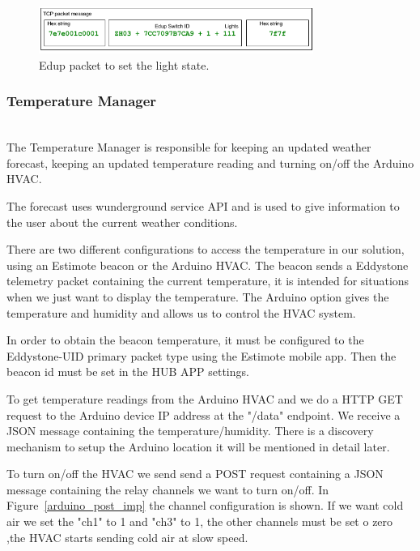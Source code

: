 \begin{figure}[h]
\centering
\includegraphics[width=0.8\textwidth]{Figures/Edup_imp}
\caption{Edup packet to set the light state.}
\label{edup_imp}
\end{figure}


\subsubsection{Temperature Manager}\mbox{}\\


The Temperature Manager is responsible for keeping an updated weather forecast, keeping an updated temperature reading and turning on/off the Arduino \ac{HVAC}.

The forecast uses wunderground service API and is used to give information to the user about the current weather conditions.

There are two different configurations to access the temperature in our solution, using an Estimote beacon or the Arduino \ac{HVAC}. 
The beacon sends a Eddystone telemetry packet containing the current temperature, it is intended for situations when we just want to display the temperature.
The Arduino option gives the temperature and humidity and allows us to control the \ac{HVAC} system.


In order to obtain the beacon temperature, it must be configured to the Eddystone-UID primary packet type using the Estimote mobile app. Then the beacon id must be set in the HUB APP settings.

To get temperature readings from the Arduino \ac{HVAC} and we do a \ac{HTTP}  GET request to the Arduino device IP address at the "/data" endpoint. We receive a \ac{JSON} message containing the temperature/humidity. There is a discovery mechanism to setup the Arduino location it will be mentioned in detail later.

To turn on/off the \ac{HVAC} we send send a POST request containing a \ac{JSON} message containing the relay channels we want to turn on/off. In Figure~\ref{arduino_post_imp} the channel configuration is shown. If we want cold air we set the "ch1" to 1 and "ch3" to 1, the other channels must be set o zero ,the \ac{HVAC} starts sending cold air at slow speed.


